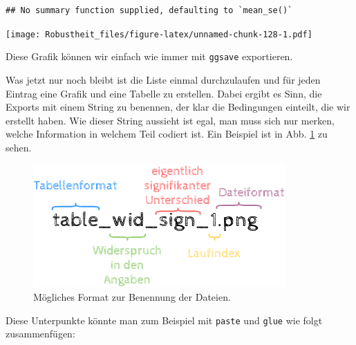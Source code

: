 \documentclass[
]{book}
\begin{document}
\begin{verbatim}
## No summary function supplied, defaulting to `mean_se()`
\end{verbatim}

\texttt{[image: Robustheit\_files/figure-latex/unnamed-chunk-128-1.pdf]}

Diese Grafik können wir einfach wie immer mit \texttt{ggsave} exportieren.

Was jetzt nur noch bleibt ist die Liste einmal durchzulaufen und für jeden Eintrag eine Grafik und eine Tabelle zu erstellen.
Dabei ergibt es Sinn, die Exports mit einem String zu benennen, der klar die Bedingungen einteilt, die wir erstellt haben.
Wie dieser String aussieht ist egal, man muss sich nur merken, welche Information in welchem Teil codiert ist.
Ein Beispiel ist in Abb. \ref{fig:fileName} zu sehen.



\begin{figure}

{\centering \includegraphics[width=.8\textwidth]{imgs/file_name} 

}

\caption{Mögliches Format zur Benennung der Dateien.}\label{fig:fileName}
\end{figure}

Diese Unterpunkte könnte man zum Beispiel mit \texttt{paste} und \texttt{glue} wie folgt zusammenfügen:
\end{document}
